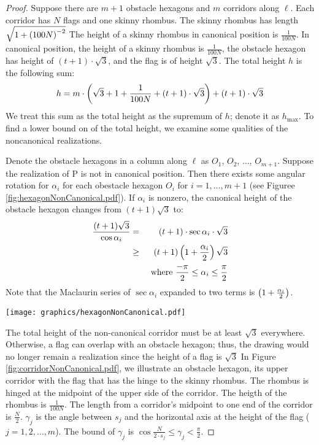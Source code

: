 \begin{proof}
Suppose there are $m+1$ obstacle hexagons and $m$ corridors along $\ell$.
Each corridor has $N$ flags and one skinny rhombus. 
The skinny rhombus  has length $\sqrt{1 + \left( 100N \right)^{-2}}$
The height of a skinny rhombus in canonical position is $\frac{1}{100N}$.
In canonical position, the height of a skinny rhombus is $\frac{1}{100N}$, the obstacle hexagon has height of $ (t+1) \cdot \sqrt{3}$, and the flag is of height $\sqrt{3}$.  
The total height $h$ is the following sum:
$$h = m \cdot \left( \sqrt{3} + 1 + \frac{1}{100N} + (t+1) \cdot \sqrt{3} \right) + (t+1) \cdot \sqrt{3}$$
We treat this sum as the total height as the supremum of $h$; denote it as $h_\text{max}$.
To find a lower bound on of the total height, we examine some qualities of the noncanonical realizations.

Denote the obstacle hexagons in a column along $\ell$ as $O_1$, $O_2$, $\ldots$, $O_{m+1}$.
Suppose the realization of P is not in canonical position.
Then there exists some angular rotation for $\alpha_i$ for each obestacle hexagon $O_i$ for $i = 1 , \ldots, m+1$ (see Figuree \ref{fig:hexagonNonCanonical.pdf}).
If $\alpha_i$ is nonzero, the canonical height of the obstacle hexagon changes from $(t+1) \sqrt{3}$ to:
\begin{eqnarray*}
\frac{(t+1) \sqrt{3}}{\cos \alpha_i} &=& (t+1) \cdot \sec \alpha_i \cdot \sqrt{3}\\
&\geq& (t+1) \left( 1 + \frac{\alpha_i}{2} \right) \sqrt{3}\\
&&\text{ where } \frac{-\pi}{2} \leq \alpha_i \leq \frac{\pi}{2}
\end{eqnarray*}
Note that the Maclaurin series of $\sec \alpha_i$ expanded to two terms is $\left( 1 + \frac{\alpha_i}{2} \right) $.

\begin{minipage}{\linewidth}
\begin{center}
\texttt{[image: graphics/hexagonNonCanonical.pdf]}
\label{fig:hexagonNonCanonical.pdf}
\end{center}
\end{minipage}


The total height of the non-canonical corridor must be at least $\sqrt{3}$ everywhere.
Otherwise, a flag can overlap with an obstacle hexagon; thus, the drawing would no longer remain a realization since the height of a flag is $\sqrt{3}$
In Figure \ref{fig:corridorNonCanonical.pdf}, we illustrate an obstacle hexagon, its upper corridor with the flag that has the hinge to the skinny rhombus.  
The rhombus is hinged at the midpoint of the upper side of the corridor.
The heigth of the rhombus is $\frac{1}{100N}$.
The length from a corridor's midpoint to one end of the corridor is $\frac{N}{2}$.
$\gamma_j$ is the angle between $s_j$ and the horizontal axis at the height of the flag ($j = 1,2,\ldots, m$).
The bound of $\gamma_j$ is $\cos {\frac{N}{2\cdot s_j }} \leq \gamma_j < \frac{\pi}{2}$.


\end{proof}
